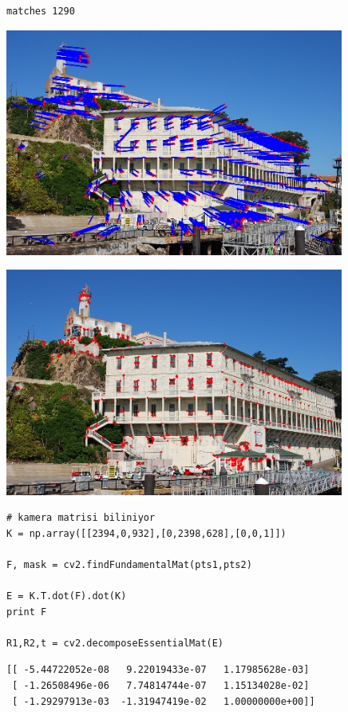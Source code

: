\documentclass[12pt,fleqn]{article}\usepackage{../../common}
\begin{document}
\begin{verbatim}
matches 1290
\end{verbatim}

\includegraphics[width=30em]{vision_20recons_01.jpg}

\includegraphics[width=30em]{vision_20recons_02.jpg}

\begin{verbatim}
# kamera matrisi biliniyor
K = np.array([[2394,0,932],[0,2398,628],[0,0,1]])

F, mask = cv2.findFundamentalMat(pts1,pts2)

E = K.T.dot(F).dot(K)
print F

R1,R2,t = cv2.decomposeEssentialMat(E)
\end{verbatim}

\begin{verbatim}
[[ -5.44722052e-08   9.22019433e-07   1.17985628e-03]
 [ -1.26508496e-06   7.74814744e-07   1.15134028e-02]
 [ -1.29297913e-03  -1.31947419e-02   1.00000000e+00]]
\end{verbatim}
\end{document}
